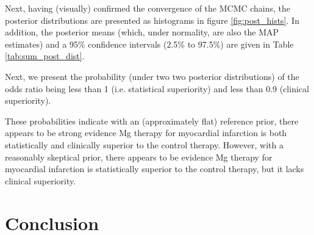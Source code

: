 \documentclass[fleqn,10pt]{SelfArx} %
\begin{document}
Next, having (visually) confirmed the convergence of the MCMC chains, the posterior distributions are presented as histograms in figure \ref{fig:post_hists}. In addition, the posterior means (which, under normality, are also the MAP estimates) and a 95\% confidence intervals (2.5\% to 97.5\%) are given in Table \ref{tab:sum_post_dist}.

Next, we present the probability (under two two posterior distributions) of the odds ratio being less than 1 (i.e. statistical superiority) and less than 0.9 (clinical superiority).

These probabilities indicate with an (approximately flat) reference prior, there appears to be strong evidence Mg therapy for myocardial infarction is both statistically and clinically superior to the control therapy. However, with a reasonably skeptical prior, there appears to be evidence Mg therapy for myocardial infarction is statistically superior to the control therapy, but it lacks clinical superiority.


\section{Conclusion}





\end{document}

